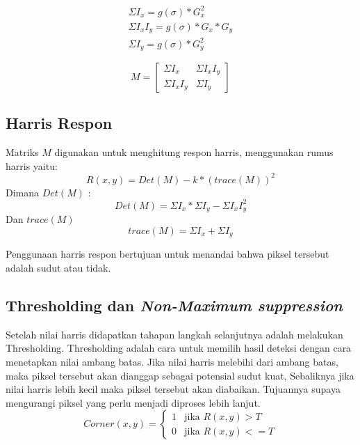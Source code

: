 \begin{equation*}
    \begin{aligned}
        \Sigma I_{x} = g(\sigma) * G_{x}^2 \\
        \Sigma I_{x}I_{y} = g(\sigma) * G_{x} * G_{y} \\
        \Sigma I_{y} = g(\sigma) * G_{y}^2
    \end{aligned}
\end{equation*}

\begin{equation}
    M = 
    \begin{bmatrix}
        \Sigma I_{x} & \Sigma I_{x}I_{y} \\
        \Sigma I_{x}I_{y} & \Sigma I_{y}
    \end{bmatrix} 
\end{equation}

\subsection{Harris Respon}
    Matriks \(M\) digunakan untuk menghitung respon harris, menggunakan rumus harris yaitu:
\begin{equation}
    R(x,y) = Det(M) - k * (trace(M))^2
\end{equation}
Dimana \(Det(M)\) :
\begin{equation*}
    Det(M) = \Sigma I_{x} * \Sigma I_{y} - \Sigma I_{x}I_{y}^2
\end{equation*}
Dan \(trace(M)\) 
\begin{equation*}
    trace(M) = \Sigma I_{x} + \Sigma I_{y}
\end{equation*}

    Penggunaan harris respon bertujuan untuk menandai bahwa piksel tersebut adalah sudut atau tidak.


\subsection{Thresholding dan \emph{Non-Maximum suppression}}
    Setelah nilai harris didapatkan tahapan langkah selanjutnya adalah melakukan Thresholding.
Thresholding adalah cara untuk memilih hasil deteksi dengan cara menetapkan nilai ambang batas.
Jika nilai harris melebihi dari ambang batas, maka piksel tersebut akan dianggap sebagai potensial sudut kuat, Sebaliknya jika nilai harris lebih kecil maka piksel tersebut akan diabaikan.
Tujuannya supaya mengurangi piksel yang perlu menjadi diproses lebih lanjut. 
\begin{equation}
    Corner(x,y) = 
    \begin{cases}  
        1 & \text{jika } R(x,y) > T \\ 
        0 & \text{jika } R(x,y) <= T
    \end{cases}
\end{equation}

